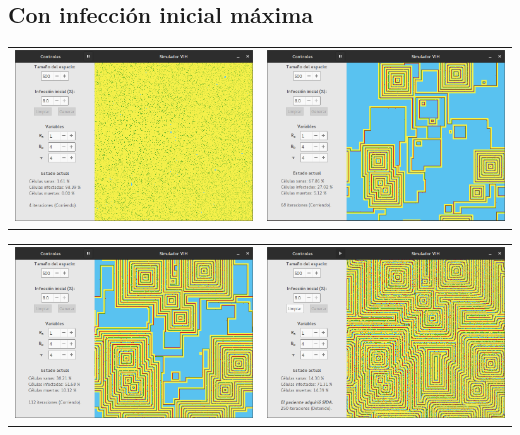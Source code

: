 \documentclass[12pt,letterpaper,oneside]{report}
\begin{document}
	\subsection{Con infección inicial máxima} %
	\label{sub:con_infecci_n_inicial_m_xima}
	\begin{center}
		\begin{tabular}{c c}
		\includegraphics[width=8cm]{img/original/max/1.png} & \includegraphics[width=8cm]{img/original/max/2.png} \\
		\end{tabular}
	\end{center}

	\begin{center}
		\begin{tabular}{c c}
		\includegraphics[width=8cm]{img/original/max/3.png} & \includegraphics[width=8cm]{img/original/max/4.png} \\
		\end{tabular}
	\end{center}
\end{document}

